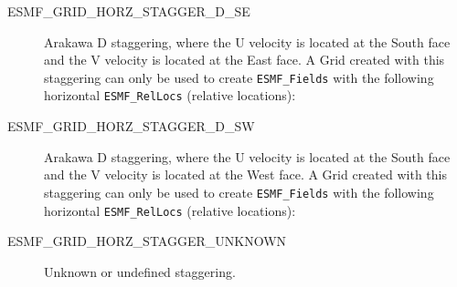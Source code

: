 \begin{description}
    \item [ESMF\_GRID\_HORZ\_STAGGER\_D\_SE]
          Arakawa D staggering, where the U velocity is located at the South face
          and the V velocity is located at the East face.  A Grid created with
          this staggering can only be used to create {\tt ESMF\_Fields} with the
          following horizontal {\tt ESMF\_RelLocs} (relative locations):
 
    \item [ESMF\_GRID\_HORZ\_STAGGER\_D\_SW]
          Arakawa D staggering, where the U velocity is located at the South face
          and the V velocity is located at the West face.  A Grid created with
          this staggering can only be used to create {\tt ESMF\_Fields} with the
          following horizontal {\tt ESMF\_RelLocs} (relative locations):


    \item [ESMF\_GRID\_HORZ\_STAGGER\_UNKNOWN]
          Unknown or undefined staggering.

 \end{description}


% 
% 


